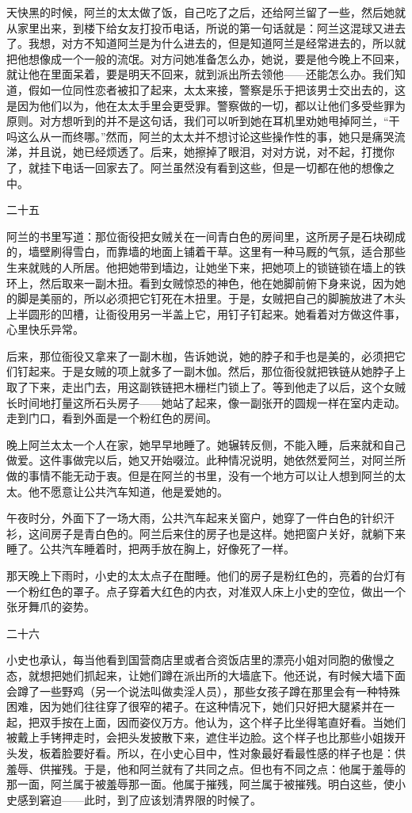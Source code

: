 天快黑的时候，阿兰的太太做了饭，自己吃了之后，还给阿兰留了一些，然后她就从家里出来，到楼下给女友打投币电话，所说的第一句话就是：阿兰这混球又进去了。我想，对方不知道阿兰是为什么进去的，但是知道阿兰是经常进去的，所以就把他想像成一个一般的流氓。对方问她准备怎么办，她说，要是他今晚上不回来，就让他在里面呆着，要是明天不回来，就到派出所去领他——还能怎么办。我们知道，假如一位同性恋者被扣了起来，太太来接，警察是乐于把该男士交出去的，这是因为他们以为，他在太太手里会更受罪。警察做的一切，都以让他们多受些罪为原则。对方想听到的并不是这句话，我们可以听到她在耳机里劝她甩掉阿兰，“干吗这么从一而终哪。”然而，阿兰的太太并不想讨论这些操作性的事，她只是痛哭流涕，并且说，她已经烦透了。后来，她擦掉了眼泪，对对方说，对不起，打搅你了，就挂下电话一回家去了。阿兰虽然没有看到这些，但是一切都在他的想像之中。 

二十五 

阿兰的书里写道：那位衙役把女贼关在一间青白色的房间里，这所房子是石块砌成的，墙壁刷得雪白，而靠墙的地面上铺着干草。这里有一种马厩的气氛，适合那些生来就贱的人所居。他把她带到墙边，让她坐下来，把她项上的锁链锁在墙上的铁环上，然后取来一副木扭。看到女贼惊恐的神色，他在她脚前俯下身来说，因为她的脚是美丽的，所以必须把它钉死在木扭里。于是，女贼把自己的脚腕放进了木头上半圆形的凹槽，让衙役用另一半盖上它，用钉子钉起来。她看着对方做这件事，心里快乐异常。 

后来，那位衙役又拿来了一副木枷，告诉她说，她的脖子和手也是美的，必须把它们钉起来。于是女贼的项上就多了一副木伽。然后，那位衙役就把铁链从她脖子上取了下来，走出门去，用这副铁链把木栅栏门锁上了。等到他走了以后，这个女贼长时间地打量这所石头房子——她站了起来，像一副张开的圆规一样在室内走动。走到门口，看到外面是一个粉红色的房间。 

晚上阿兰太太一个人在家，她早早地睡了。她辗转反侧，不能入睡，后来就和自己做爱。这件事做完以后，她又开始啜泣。此种情况说明，她依然爱阿兰，对阿兰所做的事情不能无动于衷。但是在阿兰的书里，没有一个地方可以让人想到阿兰的太太。他不愿意让公共汽车知道，他是爱她的。 

午夜时分，外面下了一场大雨，公共汽车起来关窗户，她穿了一件白色的针织汗衫，这间房子是青白色的。阿兰后来住的房子也是这样。她把窗户关好，就躺下来睡了。公共汽车睡着时，把两手放在胸上，好像死了一样。 

那天晚上下雨时，小史的太太点子在酣睡。他们的房子是粉红色的，亮着的台灯有一个粉红色的罩子。点子穿着大红色的内衣，对准双人床上小史的空位，做出一个张牙舞爪的姿势。 

二十六 

小史也承认，每当他看到国营商店里或者合资饭店里的漂亮小姐对同胞的傲慢之态，就想把她们抓起来，让她们蹲在派出所的大墙底下。他还说，有时候大墙下面会蹲了一些野鸡（另一个说法叫做卖淫人员），那些女孩子蹲在那里会有一种特殊困难，因为她们往往穿了很窄的裙子。在这种情况下，她们只好把大腿紧并在一起，把双手按在上面，因而姿仪万方。他认为，这个样子比坐得笔直好看。当她们被戴上手铐押走时，会把头发披散下来，遮住半边脸。这个样子也比那些小姐拨开头发，板着脸要好看。所以，在小史心目中，性对象最好看最性感的样子也是：供羞辱、供摧残。于是，他和阿兰就有了共同之点。但也有不同之点：他属于羞辱的那一面，阿兰属于被羞辱那一面。他属于摧残，阿兰属于被摧残。明白这些，使小史感到窘迫——此时，到了应该划清界限的时候了。 


